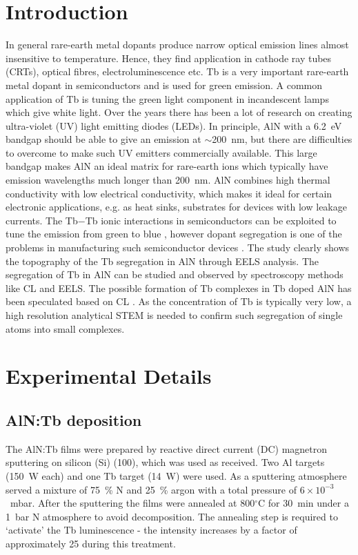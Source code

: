 \documentclass[%
aip,
rsi,%
 amsmath,amssymb,%
 reprint,%
]{revtex4-1}
\begin{document}
\section{Introduction}
\label{sec:Intro}

In general rare-earth metal dopants\cite{Kenyon2003,Kenyon2002} produce narrow optical emission lines almost insensitive to temperature. Hence, they find application in cathode ray tubes (CRTs), optical fibres, electroluminescence etc\cite{Aitasalo2003}. Tb is a very important rare-earth metal dopant in semiconductors and is used for green emission. A common application of Tb is tuning the green light component in incandescent lamps which give white light. Over the years there has been a lot of research on creating ultra-violet (UV) light emitting diodes (LEDs). In principle, AlN with a 6.2~eV bandgap should be able to give an emission at $\sim$200~nm, but there are difficulties to overcome to make such UV emitters commercially available. This large bandgap makes AlN an ideal matrix for rare-earth ions which typically have emission wavelengths much longer than 200~nm. AlN combines high thermal conductivity with low electrical conductivity, which makes it ideal for certain electronic applications, e.g. as heat sinks, substrates for devices with low leakage currents. The Tb$-$Tb ionic interactions in semiconductors can be exploited to tune the emission from green to blue \cite{Benz2013}, however dopant segregation is one of the problems in manufacturing such semiconductor devices \cite{Keizer2015}. The study clearly shows the topography of the Tb segregation in AlN through EELS analysis. The segregation of Tb in AlN can be studied and observed by spectroscopy methods like CL and EELS. The possible formation of Tb complexes in Tb doped AlN has been speculated based on CL \cite{Benz2013_AlNTb}. As the concentration of Tb is typically very low, a high resolution analytical STEM is needed to confirm such segregation of single atoms into small complexes.
\section{Experimental Details}
\label{sec:exp_detail}
\subsection{AlN:Tb deposition}
\label{sec:growth}
The AlN:Tb films were prepared by reactive direct current (DC) magnetron sputtering on silicon (Si) (100), which was used as received. Two Al targets (150~W each) and one Tb target (14~W) were used. As a sputtering atmosphere served a mixture of 75~\% N and 25~\% argon with a total pressure of $6 \times 10^{-3}$~mbar. After the sputtering the films were annealed at 800$^\circ$C for 30~min under a 1~bar N atmosphere to avoid decomposition. The annealing step is required to \lq{activate}\rq{} the Tb luminescence - the intensity increases by a factor of approximately 25 during this treatment.
\end{document}
